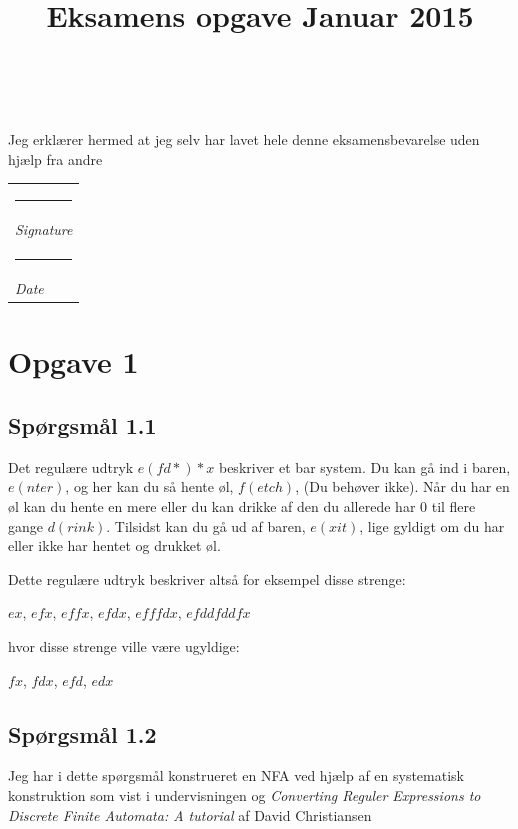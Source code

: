 \documentclass[danish,a4paper]{report}
\title{\Huge \textbf{\titlename}\\\huge Eksamens opgave Januar 2015}
\author{\textsc{\name} \\ \textsc{\email}}
\makeatletter
\newcommand{\namesigdate}[2][10cm]{%
  \begin{tabular}{@{}p{#1}@{}}
    #2 \\[2\normalbaselineskip] \hrule \\[0pt]
    {\small \textit{Signature}} \\[2\normalbaselineskip] \hrule \\[0pt]
    {\small \textit{Date}}
  \end{tabular}
}
\makeatother
\begin{document}
\maketitle

\vspace*{\fill}
\begin{center}
\begin{large}
Jeg erklærer hermed at jeg selv har lavet hele denne eksamensbevarelse uden hjælp fra andre
\end{large}

\vspace*{2cm}
\namesigdate{}
\end{center}

\vspace*{\fill}


\newpage

\chapter*{Opgave 1}
\section*{Spørgsmål 1.1}
Det regulære udtryk $e(fd*)*x$ beskriver et bar system. Du kan gå ind i baren, $e(nter)$, og her kan du så hente øl, $f(etch)$, (Du behøver ikke). Når du har en øl kan du hente en mere eller du kan drikke af den du allerede har 0 til flere gange $d(rink)$. Tilsidst kan du gå ud af baren, $e(xit)$, lige gyldigt om du har eller ikke har hentet og drukket øl.

Dette regulære udtryk beskriver altså for eksempel disse strenge:
\begin{center}$ ex$,
$efx$,
$effx$,
$efdx$,
$efffdx$,
$efddfddfx$
\end{center}
hvor disse strenge ville være ugyldige:
\begin{center}
$fx$,
$fdx$,
$efd$,
$edx$
\end{center}
\section*{Spørgsmål 1.2}
\label{sec:sp2}

Jeg har i dette spørgsmål konstrueret en NFA ved hjælp af en systematisk konstruktion som vist i undervisningen og \textit{Converting Reguler Expressions to Discrete Finite Automata: A tutorial} af David Christiansen\\
\end{document}
